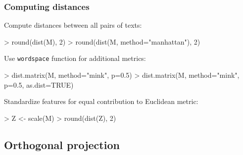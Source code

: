 \documentclass[t]{beamer} %
\begin{document}

\begin{frame}[fragile]
  \frametitle{Computing distances}

Compute distances between all pairs of texts:
\begin{Rcode}
> round(dist(M), 2)  
> round(dist(M, method="manhattan"), 2) 
\end{Rcode}

\gap[1]\pause
Use \texttt{wordspace} function for additional metrics:
\begin{Rcode}
> dist.matrix(M, method="mink", p=0.5)  
> dist.matrix(M, method="mink", p=0.5, as.dist=TRUE)
\end{Rcode}

\gap[1]\pause
Standardize features for equal contribution to Euclidean metric:
\begin{Rcode}
> Z <- scale(M)     
> round(dist(Z), 2) 
\end{Rcode}
\end{frame}

\subsection{Orthogonal projection}
\end{document}
